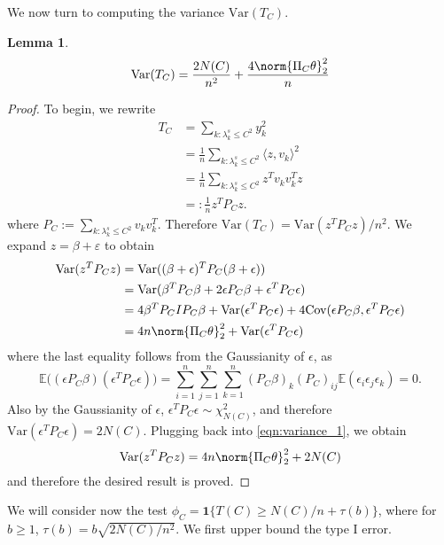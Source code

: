 \documentclass{article}
\newcommand{\dotp}[2]{\langle #1, #2 \rangle}
\newcommand{\Var}{\mathrm{Var}}
\newcommand{\Cov}{\mathrm{Cov}}
\newcommand{\1}{\mathbb{I}}
\newcommand{\Ebb}{\mathbb{E}}
\theoremstyle{alden}
\theoremstyle{aldenthm}
\newtheorem{lemma}{Lemma}
\theoremstyle{definition}
\theoremstyle{remark}
\begin{document}
We now turn to computing the variance $\Var(T_C)$.
\begin{lemma}
	\label{lem:variance}
	\begin{equation*}
	\Var(T_C) = \frac{2N(C)}{n^2} + \frac{4 \norm{\Pi_C \theta}_2^2}{n}
	\end{equation*}
\end{lemma}
\begin{proof}
	To begin, we rewrite
	\begin{align*}
	T_C & = \sum_{k:\lambda_k^s \leq C^2} y_k^2 \\
	& = \frac{1}{n} \sum_{k: \lambda_k^s \leq C^2} \dotp{z}{v_k}^2 \\
	& = \frac{1}{n} \sum_{k: \lambda_k^s \leq C^2} z^T v_k v_k^T z \\
	& =: \frac{1}{n} z^T P_{C} z.
	\end{align*}
	where $P_C := \sum_{k: \lambda_k^s \leq C^2} v_k v_k^T$. Therefore $\Var(T_C) = \Var(z^T P_{C} z)/n^2$. We expand $z = \beta + \varepsilon$ to obtain
	\begin{align}
	\Var(z^T P_{C} z) & = \Var((\beta + \epsilon)^T P_{C} (\beta + \epsilon)) \nonumber \\
	& = \Var(\beta^T P_{C} \beta + 2 \epsilon P_{C} \beta + \epsilon^T P_{C} \epsilon) \nonumber \\
	& = 4 \beta^T P_{C} I P_{C} \beta + \Var(\epsilon^T P_{C} \epsilon) + 4 \Cov(\epsilon P_{C} \beta, \epsilon^T P_{C} \epsilon) \nonumber \\
	& = 4 n \norm{\Pi_C \theta}_2^2 + \Var(\epsilon^T P_{C} \epsilon) \label{eqn:variance_1}
	\end{align}
	where the last equality follows from the Gaussianity of $\epsilon$, as
	\begin{equation*}
	\Ebb\bigl( (\epsilon P_{C} \beta) (\epsilon^T P_{C} \epsilon) \bigr) = \sum_{i = 1}^{n} \sum_{j = 1}^{n} \sum_{k = 1}^{n} (P_C\beta)_k (P_C)_{ij} \Ebb(\epsilon_i \epsilon_j \epsilon_k) = 0.
	\end{equation*}
	Also by the Gaussianity of $\epsilon$, $\epsilon^T P_C \epsilon \sim \chi_{N(C)}^2$, and therefore $\Var(\epsilon^T P_{C} \epsilon) = 2N(C)$. Plugging back into \eqref{eqn:variance_1}, we obtain
	\begin{equation*}
	\Var(z^T P_{C} z) = 4 n \norm{\Pi_C \theta}_2^2 + 2N(C) 
	\end{equation*}
	and therefore the desired result is proved.
\end{proof}

We will consider now the test $\phi_C = \mathbf{1}\{T(C) \geq N(C)/n + \tau(b)\}$, where for $b \geq 1$, $\tau(b) = b \sqrt{2N(C)/n^2}$. We first upper bound the type I error.
\end{document}
